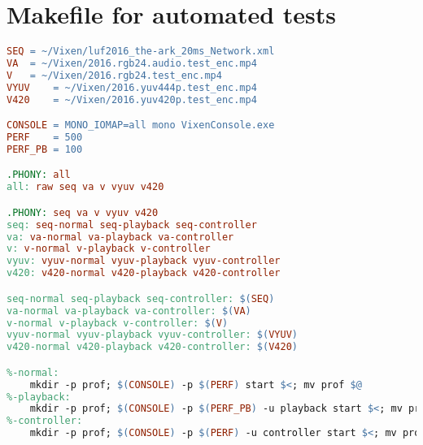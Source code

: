 \renewcommand{\baselinestretch}{1.5}
\chapter{Makefile for automated tests}
\label{App:tests}

\begin{lstfloat}
\begin{lstlisting}[language=make,label=lst:makefile,captionpos=b,caption={\footnotesize Makefile used for automated performance tests}]
SEQ	= ~/Vixen/luf2016_the-ark_20ms_Network.xml
VA	= ~/Vixen/2016.rgb24.audio.test_enc.mp4
V	= ~/Vixen/2016.rgb24.test_enc.mp4
VYUV	= ~/Vixen/2016.yuv444p.test_enc.mp4
V420	= ~/Vixen/2016.yuv420p.test_enc.mp4

CONSOLE	= MONO_IOMAP=all mono VixenConsole.exe
PERF	= 500
PERF_PB	= 100

.PHONY: all
all: raw seq va v vyuv v420

.PHONY: seq va v vyuv v420
seq: seq-normal seq-playback seq-controller
va: va-normal va-playback va-controller
v: v-normal v-playback v-controller
vyuv: vyuv-normal vyuv-playback vyuv-controller
v420: v420-normal v420-playback v420-controller

seq-normal seq-playback seq-controller: $(SEQ)
va-normal va-playback va-controller: $(VA)
v-normal v-playback v-controller: $(V)
vyuv-normal vyuv-playback vyuv-controller: $(VYUV)
v420-normal v420-playback v420-controller: $(V420)

%-normal:
	mkdir -p prof; $(CONSOLE) -p $(PERF) start $<; mv prof $@
%-playback:
	mkdir -p prof; $(CONSOLE) -p $(PERF_PB) -u playback start $<; mv prof $@
%-controller:
	mkdir -p prof; $(CONSOLE) -p $(PERF) -u controller start $<; mv prof $@
\end{lstlisting}
\end{lstfloat}

\iffalse
\lref{lst:makefile} shows one Makefile used for video transcoding and PSNR testing.

\begin{lstlisting}[float,floatplacement=ht,language=XML,label=lst:makefile,captionpos=b,caption={\footnotesize Makefile used for automated video transcoding}]
INPUT	?= $(wildcard *raw.mp4)
AUDIO	?= $(wildcard *audio.mp3)
OUTPUT	:= yuv444p-0.mp4 yuv444p-6.mp4 yuv444p-12.mp4 yuv420p-0.mp4
OUTPUT	+= rgb24-0.mp4 rgb24-6.mp4 rgb24-12.mp4 rgb24-24.mp4 rgb24-0-audio.mp4
ROOT	:= $(dir $(realpath $(lastword $(MAKEFILE_LIST))))

all: $(OUTPUT)
psnr: $(OUTPUT:%=psnr-%)

.SECONDARY:
.DELETE_ON_ERROR:
yuv420p-%.mp4: $(INPUT)
	ffmpeg -i "$<" -crf $* -codec:v libx264 -pix_fmt yuv420p -y "$@"
yuv444p-%.mp4: $(INPUT)
	ffmpeg -i "$<" -crf $* -codec:v libx264 -pix_fmt yuv444p -y "$@"
rgb24-%.mp4: $(INPUT)
	ffmpeg -i "$<" -crf $* -codec:v libx264rgb -pix_fmt rgb24 -y "$@"
rgb24-%-audio.mp4: $(INPUT) $(AUDIO)
	ffmpeg -i "$(INPUT)" -i $(AUDIO) -c:v copy -c:a copy "$@"
psnr-%: $(ROOT)psnr.sh % $(INPUT)
	$^ 2>&1 | tail -n 1
\end{lstlisting}
\fi

